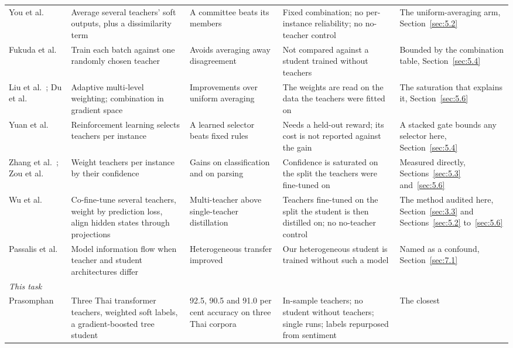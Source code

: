 \begin{center}
{\begin{longtable}{p{2.35cm}p{3.2cm}p{2.4cm}p{3.0cm}p{2.4cm}}
You et al.\ \cite{you2017learning} & Average several teachers' soft outputs, plus a dissimilarity term &
A committee beats its members & Fixed combination; no per-instance reliability; no no-teacher control &
The uniform-averaging arm, Section~\ref{sec:5.2} \\
Fukuda et al.\ \cite{fukuda2017efficient} & Train each batch against one randomly chosen teacher &
Avoids averaging away disagreement & Not compared against a student trained without teachers & Bounded
by the combination table, Section~\ref{sec:5.4} \\
Liu et al.\ \cite{liu2020adaptive}; Du et al.\ \cite{du2020agree} & Adaptive multi-level weighting;
combination in gradient space & Improvements over uniform averaging & The weights are read on the data
the teachers were fitted on & The saturation that explains it, Section~\ref{sec:5.6} \\
Yuan et al.\ \cite{yuan2021reinforced} & Reinforcement learning selects teachers per instance & A
learned selector beats fixed rules & Needs a held-out reward; its cost is not reported against the
gain & A stacked gate bounds any selector here, Section~\ref{sec:5.4} \\
Zhang et al.\ \cite{zhang2022confidence}; Zou et al.\ \cite{zou2025dynamic} & Weight teachers per
instance by their confidence & Gains on classification and on parsing & Confidence is saturated on the
split the teachers were fine-tuned on & Measured directly, Sections~\ref{sec:5.3}
and~\ref{sec:5.6} \\
Wu et al.\ \cite{wu2021one} & Co-fine-tune several teachers, weight by prediction loss, align hidden
states through projections & Multi-teacher above single-teacher distillation & Teachers fine-tuned on
the split the student is then distilled on; no no-teacher control & The method audited here,
Section~\ref{sec:3.3} and Sections~\ref{sec:5.2} to~\ref{sec:5.6} \\
Passalis et al.\ \cite{passalis2020heterogeneous} & Model information flow when teacher and student
architectures differ & Heterogeneous transfer improved & Our heterogeneous student is trained without
such a model & Named as a confound, Section~\ref{sec:7.1} \\
\midrule
\multicolumn{5}{l}{\emph{This task}} \\*
Prasomphan \cite{prasomphan2025mtkd} & Three Thai transformer teachers, weighted soft labels, a
gradient-boosted tree student & 92.5, 90.5 and 91.0 per cent accuracy on three Thai corpora & In-sample
teachers; no student without teachers; single runs; labels repurposed from sentiment & The closest

\end{longtable}}
\end{center}
